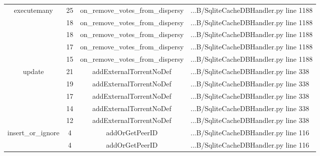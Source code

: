 \begin{table}[!h]
{\begin{tabular}{|c|c|c|l|}
		\multicolumn{1}{|c|}{\multirow{5}{*}{executemany}} & \multicolumn{1}{c|}{25} & \multicolumn{1}{c|}{on\_remove\_votes\_from\_dispersy} & \multicolumn{1}{l|}{...B/SqliteCacheDBHandler.py line 1188} \\ \cline{2-4}
		\multicolumn{1}{|c|}{} & \multicolumn{1}{c|}{18}  & \multicolumn{1}{c|}{on\_remove\_votes\_from\_dispersy}  & \multicolumn{1}{l|}{...B/SqliteCacheDBHandler.py line 1188}  \\ \cline{2-4} 
		\multicolumn{1}{|c|}{} & \multicolumn{1}{c|}{18}  & \multicolumn{1}{c|}{on\_remove\_votes\_from\_dispersy}  & \multicolumn{1}{l|}{...B/SqliteCacheDBHandler.py line 1188}  \\ \cline{2-4} 
		\multicolumn{1}{|c|}{} & \multicolumn{1}{c|}{17}  & \multicolumn{1}{c|}{on\_remove\_votes\_from\_dispersy}  & \multicolumn{1}{l|}{...B/SqliteCacheDBHandler.py line 1188}  \\ \cline{2-4} 
		\multicolumn{1}{|c|}{} & \multicolumn{1}{c|}{15}  & \multicolumn{1}{c|}{on\_remove\_votes\_from\_dispersy}  & \multicolumn{1}{l|}{...B/SqliteCacheDBHandler.py line 1188}  \\ \hline 
		\multicolumn{1}{|c|}{\multirow{5}{*}{update}} & \multicolumn{1}{c|}{21} & \multicolumn{1}{c|}{addExternalTorrentNoDef} & \multicolumn{1}{l|}{...B/SqliteCacheDBHandler.py line 338} \\ \cline{2-4}
		\multicolumn{1}{|c|}{} & \multicolumn{1}{c|}{19}  & \multicolumn{1}{c|}{addExternalTorrentNoDef}  & \multicolumn{1}{l|}{...B/SqliteCacheDBHandler.py line 338}  \\ \cline{2-4} 
		\multicolumn{1}{|c|}{} & \multicolumn{1}{c|}{17}  & \multicolumn{1}{c|}{addExternalTorrentNoDef}  & \multicolumn{1}{l|}{...B/SqliteCacheDBHandler.py line 338}  \\ \cline{2-4} 
		\multicolumn{1}{|c|}{} & \multicolumn{1}{c|}{14}  & \multicolumn{1}{c|}{addExternalTorrentNoDef}  & \multicolumn{1}{l|}{...B/SqliteCacheDBHandler.py line 338}  \\ \cline{2-4} 
		\multicolumn{1}{|c|}{} & \multicolumn{1}{c|}{12}  & \multicolumn{1}{c|}{addExternalTorrentNoDef}  & \multicolumn{1}{l|}{...B/SqliteCacheDBHandler.py line 338}  \\ \hline 
		\multicolumn{1}{|c|}{\multirow{5}{*}{insert\_or\_ignore}} & \multicolumn{1}{c|}{4} & \multicolumn{1}{c|}{addOrGetPeerID} & \multicolumn{1}{l|}{...B/SqliteCacheDBHandler.py line 116} \\ \cline{2-4}
		\multicolumn{1}{|c|}{} & \multicolumn{1}{c|}{4}  & \multicolumn{1}{c|}{addOrGetPeerID}  & \multicolumn{1}{l|}{...B/SqliteCacheDBHandler.py line 116}  \\ \cline{2-4} 

\end{tabular}}
\end{table}
